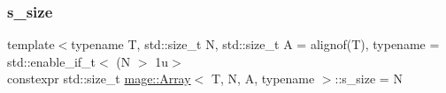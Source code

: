 \subsubsection{\texorpdfstring{s\+\_\+size}{s\_size}}
{\footnotesize\ttfamily template$<$typename T, std\+::size\+\_\+t N, std\+::size\+\_\+t A = alignof(\+T), typename  = std\+::enable\+\_\+if\+\_\+t$<$ (\+N $>$ 1u$>$ \\
constexpr std\+::size\+\_\+t \mbox{\hyperlink{structmage_1_1_array}{mage\+::\+Array}}$<$ T, N, A, typename $>$\+::s\+\_\+size = N\hspace{0.3cm}{\ttfamily [static]}}

